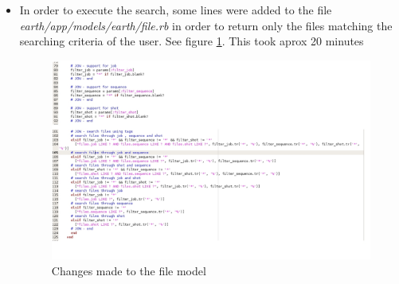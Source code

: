\documentclass[a4paper,10pt]{article}
\begin{document}
\begin{itemize}
\item In order to execute the search, some lines were added to the file \textit{earth/app/models/earth/file.rb} in order to return only the files matching the searching criteria of the user.  See figure \ref{fig:file}.  This took aprox 20 minutes
\begin{figure}[h]
 \centering
 \includegraphics[scale=0.35]{images/file.jpg}
 \caption{Changes made to the file model}
 \label{fig:file}
\end{figure}


\end{itemize}
\end{document}
